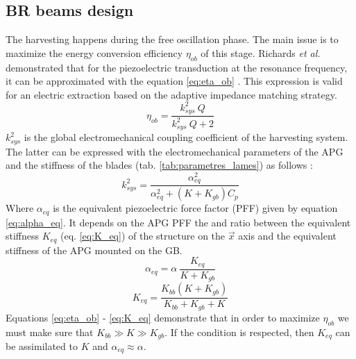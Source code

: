 \documentclass[3p,twocolumn,preprint]{elsarticle}
\begin{document}
	\subsection{BR beams design}	
	\label{subsec:BR blades design}
The harvesting happens during the free oscillation phase. The main issue is to maximize the energy conversion efficiency $\eta_{ob}$ of this stage. Richards \emph{et al.} demonstrated that for the piezoelectric transduction at the resonance frequency, it can be approximated with the equation \ref{eq:eta_ob} \cite{Richards2004}. This expression is valid for an electric extraction based on the adaptive impedance matching strategy.
\begin{equation}
	\eta_{ob} = \dfrac{k^2_{sys}\ Q}{k^2_{sys}\ Q + 2}
	\label{eq:eta_ob}
\end{equation}
$k^2_{sys}$ is the global electromechanical coupling coefficient of the harvesting system. The latter can be expressed with the electromechanical parameters of the APG and the stiffness of the blades (tab. \ref{tab:parametres_lames}) as follows :
\begin{equation}
	k^2_{sys} = \dfrac{\alpha^2_{eq}}{\alpha^2_{eq} + (K+K_{gb})C_p}
	\label{eq:k2_sys}
\end{equation}
Where $\alpha_{eq}$ is the equivalent piezoelectric force factor (PFF) given by equation \ref{eq:alpha_eq}. It depends on the APG PFF the and ratio between the equivalent stiffness $K_{eq}$ (eq. \ref{eq:K_eq}) of the structure on the $\vec{x}$ axis and the equivalent stiffness of the APG mounted on the GB.
\begin{equation}
	\alpha_{eq} = \alpha\ \dfrac{K_{eq}}{K + K_{gb}} 
	\label{eq:alpha_eq}
\end{equation}
\begin{equation}
	K_{eq} = \dfrac{K_{bb}(K + K_{gb})}{K_{bb} + K_{gb} + K}
	\label{eq:K_eq}
\end{equation}
Equations \ref{eq:eta_ob} - \ref{eq:K_eq} demonstrate that in order to maximize $\eta_{ob}$ we must make sure that $K_{bb} \gg K \gg K_{gb}$. If the condition is respected, then $K_{eq}$ can be assimilated to $K$ and $\alpha_{eq} \approx \alpha$. 
\end{document}
